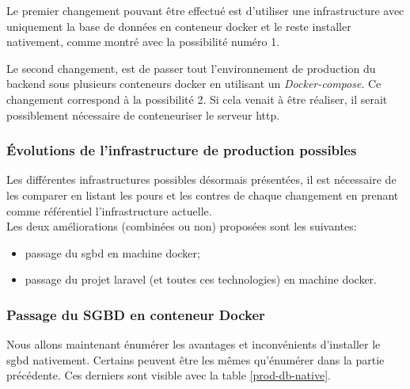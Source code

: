 \documentclass[
    iai, %
    il, %
]{heig-tb}
\begin{document}
Le premier changement pouvant être effectué est d'utiliser une infrastructure avec uniquement la base de données en \Gls{conteneur} \Gls{docker} et le reste installer nativement, comme montré avec la possibilité numéro 1.

Le second changement, est de passer tout l'environnement de production du \Gls{backend} sous plusieurs \Gls{conteneur}s \Gls{docker} en utilisant un \emph{Docker-compose}. Ce changement correspond à la possibilité 2. Si cela venait à être réaliser, il serait possiblement nécessaire de conteneuriser le serveur \Gls{http}.

\subsubsection{Évolutions de l'infrastructure de production possibles}
Les différentes infrastructures possibles désormais présentées, il est nécessaire de les comparer en listant les pours et les contres de chaque changement en prenant comme référentiel l'infrastructure actuelle.\\
Les deux améliorations (combinées ou non) proposées sont les suivantes:
\begin{itemize}
    \item passage du \Gls{sgbd} en machine \Gls{docker};
    \item passage du projet \Gls{laravel} (et toutes ces technologies) en machine \Gls{docker}.
\end{itemize}

\subsubsection{Passage du SGBD en conteneur Docker}
Nous allons maintenant énumérer les avantages et inconvénients d'installer le \Gls{sgbd} nativement.
Certains peuvent être les mêmes qu'énumérer dans la partie précédente. Ces derniers sont visible avec la table \ref{prod-db-native}.
\end{document}
